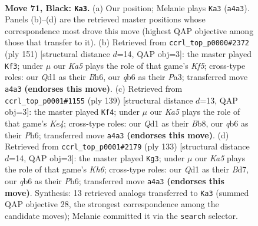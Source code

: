 \documentclass[11pt]{article}
\begin{document}
\clearpage

\begin{figure}[p]\centering
\begin{subfigure}{0.46\textwidth}\centering
\resizebox{\linewidth}{!}{%
\newchessgame
\chessboard[
  setfen={5N2/7K/1Q6/8/k7/8/8/3q4 b - - 12 71},
  showmover=false,
  pgfstyle=straightmove, color=movearrow, markmove={a4-a3}
]}
\caption{}
\end{subfigure}\hfill
\begin{subfigure}{0.46\textwidth}\centering
\resizebox{\linewidth}{!}{%
\newchessgame
\chessboard[
  setfen={8/8/7b/2N5/5k2/p2K4/P7/8 b - - 9 76},
  showmover=false,
  pgfstyle=straightmove, color=movearrow, markmove={f4-f3}
]}
\caption{}
\end{subfigure}
\\[4pt]
\begin{subfigure}{0.46\textwidth}\centering
\resizebox{\linewidth}{!}{%
\newchessgame
\chessboard[
  setfen={1b6/8/7p/2N1k2P/8/3K4/8/8 b - - 9 70},
  showmover=false,
  pgfstyle=straightmove, color=movearrow, markmove={e5-f4}
]}
\caption{}
\end{subfigure}\hfill
\begin{subfigure}{0.46\textwidth}\centering
\resizebox{\linewidth}{!}{%
\newchessgame
\chessboard[
  setfen={8/3b4/7p/3N3P/8/4K2k/8/8 b - - 0 67},
  showmover=false,
  pgfstyle=straightmove, color=movearrow, markmove={h3-g3}
]}
\caption{}
\end{subfigure}
\caption{\textbf{Move 71, Black: \texttt{Ka3}.} (a) Our position; Melanie plays \texttt{Ka3} (\texttt{a4a3}). Panels (b)--(d) are the retrieved master positions whose correspondence most drove this move (highest QAP objective among those that transfer to it). (b) Retrieved from \texttt{ccrl\_top\_p0000\#2372} (ply 151) [structural distance $d$=14, QAP obj=3]: the master played \texttt{Kf3}; under $\mu$ our \emph{Ka5} plays the role of that game's \emph{Kf5}; cross-type roles: our \emph{Q}d1 as their \emph{B}h6, our \emph{q}b6 as their \emph{P}a3; transferred move \texttt{a4a3} \textbf{(endorses this move)}. (c) Retrieved from \texttt{ccrl\_top\_p0001\#1155} (ply 139) [structural distance $d$=13, QAP obj=3]: the master played \texttt{Kf4}; under $\mu$ our \emph{Ka5} plays the role of that game's \emph{Ke4}; cross-type roles: our \emph{Q}d1 as their \emph{B}b8, our \emph{q}b6 as their \emph{P}h6; transferred move \texttt{a4a3} \textbf{(endorses this move)}. (d) Retrieved from \texttt{ccrl\_top\_p0001\#2179} (ply 133) [structural distance $d$=14, QAP obj=3]: the master played \texttt{Kg3}; under $\mu$ our \emph{Ka5} plays the role of that game's \emph{Kh6}; cross-type roles: our \emph{Q}d1 as their \emph{B}d7, our \emph{q}b6 as their \emph{P}h6; transferred move \texttt{a4a3} \textbf{(endorses this move)}. Synthesis: 13 retrieved analogs transferred to \texttt{Ka3} (summed QAP objective 28, the strongest correspondence among the candidate moves); Melanie committed it via the \texttt{search} selector.}
\label{fig:thought-m141}
\end{figure}
\end{document}
